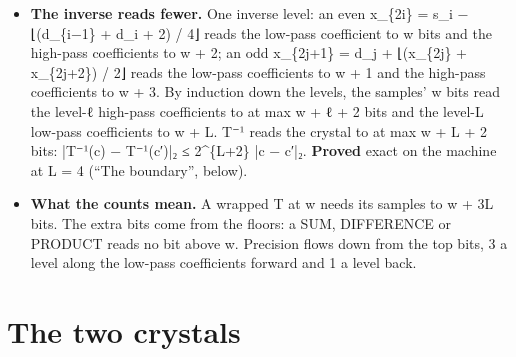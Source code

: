 \begin{itemize}
\begin{itemize}
\item Upper bound: a level reads the low-pass coefficients below it to 3 bits more, by the table.
\item Exact on the outermost sample of an interior cone. Of the level-(ℓ − 1) low-pass coefficients the cone reads, that sample reaches only the outermost, as its outer even. Adding 2\textasciicircum{}\{m+2\} to an outer even moves the low-pass coefficient above by exactly −2\textasciicircum{}\{m−1\} for m ≥ 1. Adding 2\textasciicircum{}\{w+3L−1\} to the sample moves the outermost level-1 low-pass coefficient of the cone by 2\textasciicircum{}\{w+3L−4\} in magnitude, the level-2 low-pass coefficient by 2\textasciicircum{}\{w+3L−7\}, and the level-L low-pass coefficient by 2\textasciicircum{}\{w−1\}.
\item As a 2-adic modulus: |T(x) − T(y)|₂ ≤ 2\textasciicircum{}\{3L\} |x − y|₂ along one line.
\item \textbf{Proved} on the machine, the bound and its exactness, per band: 3ℓ at the level-ℓ low-pass coefficients and 3ℓ − 2 at the level-ℓ high-pass coefficients (“The boundary”, below).
\end{itemize}
\item \textbf{The inverse reads fewer.} One inverse level: an even x\_\allowbreak{}\{2i\} = s\_\allowbreak{}i − ⌊(d\_\allowbreak{}\{i−1\} + d\_\allowbreak{}i + 2) / 4⌋ reads the low-pass coefficient to w bits and the high-pass coefficients to w + 2; an odd x\_\allowbreak{}\{2j+1\} = d\_\allowbreak{}j + ⌊(x\_\allowbreak{}\{2j\} + x\_\allowbreak{}\{2j+2\}) / 2⌋ reads the low-pass coefficients to w + 1 and the high-pass coefficients to w + 3. By induction down the levels, the samples' w bits read the level-ℓ high-pass coefficients to at max w + ℓ + 2 bits and the level-L low-pass coefficients to w + L. T⁻¹ reads the crystal to at max w + L + 2 bits: |T⁻¹(c) − T⁻¹(c′)|₂ ≤ 2\textasciicircum{}\{L+2\} |c − c′|₂. \textbf{Proved} exact on the machine at L = 4 (“The boundary”, below).
\item \textbf{What the counts mean.} A wrapped T at w needs its samples to w + 3L bits. The extra bits come from the floors: a SUM, DIFFERENCE or PRODUCT reads no bit above w. Precision flows down from the top bits, 3 a level along the low-pass coefficients forward and 1 a level back.
\end{itemize}

\section{\texorpdfstring{The two crystals}{The two crystals}}

